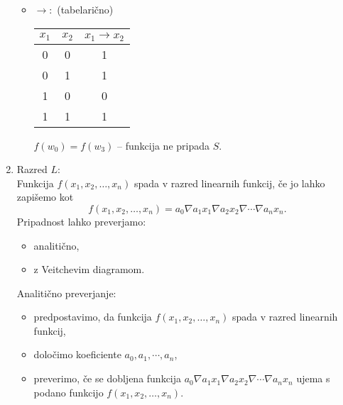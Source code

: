 \begin{resitev}
\begin{enumerate}
\begin{itemize}
\item $\rightarrow:$ (tabelarično)\\
\begin{table}[ht]
\centering
\begin{tabular}{cc|c}
$x_1$ & $x_2$ & $x_1 \rightarrow x_2$\\
\hline
0 & 0 & 1\\
0 & 1 & 1\\
\hline
1 & 0 & 0\\
1 & 1 & 1
\end{tabular}
\end{table}

$f(w_0) = f(w_3)$ -- funkcija ne pripada $S$.
\end{itemize}

\item Razred $L:$\\
Funkcija $f(x_1,x_2,\ldots,x_n)$ spada v razred linearnih funkcij, če jo lahko zapišemo kot
$$
f(x_1,x_2,\ldots,x_n) = a_0 \nabla a_1 x_1 \nabla a_2 x_2 \nabla \cdots \nabla a_n x_n.
$$
Pripadnost lahko preverjamo:
\begin{itemize}
\item analitično,
\item z Veitchevim diagramom.
\end{itemize}

Analitično preverjanje:
\begin{itemize}
\item predpostavimo, da funkcija $f(x_1,x_2,\ldots,x_n)$ spada v razred linearnih funkcij,
\item določimo koeficiente $a_0,a_1,\cdots,a_n$,
\item preverimo, če se dobljena funkcija $a_0 \nabla a_1 x_1 \nabla a_2 x_2 \nabla \cdots \nabla a_n x_n$ ujema s podano funkcijo $f(x_1,x_2,\ldots,x_n)$.
\end{itemize}


\end{enumerate}
\end{resitev}
